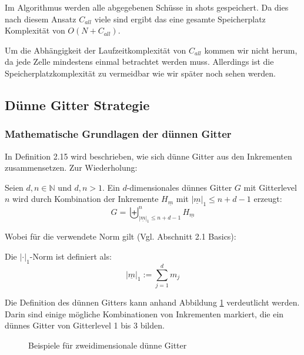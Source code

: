 \documentclass[a4paper,12pt]{llncs}
\numberwithin{equation}{section}
\begin{document}
Im Algorithmus werden alle abgegebenen Schüsse in shots gespeichert. Da dies nach diesem Ansatz $C_{all}$ viele sind ergibt das eine gesamte Speicherplatz Komplexität von $O(N+C_{all})$.

Um die Abhängigkeit der Laufzeitkomplexität von $C_{all}$ kommen wir nicht herum, da jede Zelle mindestens einmal betrachtet werden muss. Allerdings ist die Speicherplatzkomplexität zu vermeidbar wie wir später noch sehen werden. 


\subsection{Dünne Gitter Strategie}

\subsubsection{Mathematische Grundlagen der dünnen Gitter}

In \cite{M13} Definition 2.15 wird beschrieben, wie sich dünne Gitter aus den Inkrementen zusammensetzen. Zur Wiederholung:

\begin{definition}
	Seien $d,n\in\mathbb{N}$ und $d,n>1$. Ein $d$-dimensionales dünnes Gitter $G$ mit Gitterlevel $n$ wird durch Kombination der Inkremente $H_{\underline{m}}$ mit $|\underline{m}|_1\leq n+d-1$ erzeugt:
	\begin{equation}
	G=\biguplus_{|\underline{m}|_1\leq n+d-1}^n H_{\underline{m}}
	\end{equation}
\end{definition}

Wobei für die verwendete Norm gilt (Vgl. \cite{P10} Abschnitt 2.1 Basics):

\begin{definition}
Die  $|\cdot|_1$-Norm ist definiert als:
	\begin{equation}
	|\underline{m}|_1:=\sum_{j=1}^d m_j
	\end{equation}
\end{definition}


Die Definition des dünnen Gitters kann anhand Abbildung \ref{fig:gitter03} verdeutlicht werden. Darin sind einige mögliche Kombinationen von Inkrementen markiert, die ein dünnes Gitter von Gitterlevel 1 bis 3 bilden.

\begin{figure}
	\caption{Beispiele für zweidimensionale dünne Gitter}
	\label{fig:gitter03}
\end{figure}
\end{document}
